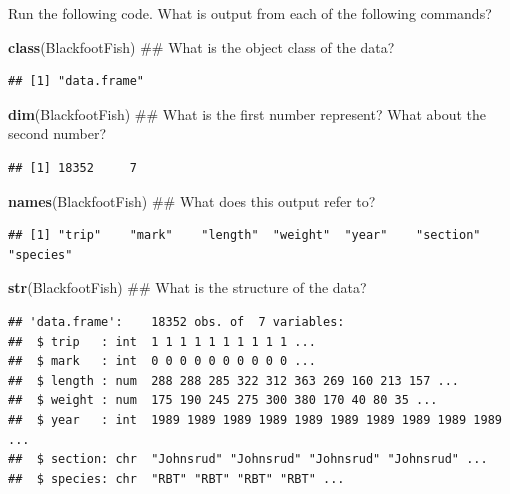 \documentclass[]{article}
\newenvironment{Shaded}{\begin{snugshade}}{\end{snugshade}}
\newcommand{\KeywordTok}[1]{\textcolor[rgb]{0.13,0.29,0.53}{\textbf{#1}}}
\newcommand{\NormalTok}[1]{#1}
\begin{document}
Run the following code. What is output from each of the following
commands?

\vspace{0.25cm}

\begin{Shaded}
\begin{Highlighting}[]
\KeywordTok{class}\NormalTok{(BlackfootFish)  ## What is the object class of the data?}
\end{Highlighting}
\end{Shaded}

\begin{verbatim}
## [1] "data.frame"
\end{verbatim}

\begin{Shaded}
\begin{Highlighting}[]
\KeywordTok{dim}\NormalTok{(BlackfootFish)  ## What is the first number represent? What about the second number?}
\end{Highlighting}
\end{Shaded}

\begin{verbatim}
## [1] 18352     7
\end{verbatim}

\begin{Shaded}
\begin{Highlighting}[]
\KeywordTok{names}\NormalTok{(BlackfootFish)  ## What does this output refer to?}
\end{Highlighting}
\end{Shaded}

\begin{verbatim}
## [1] "trip"    "mark"    "length"  "weight"  "year"    "section" "species"
\end{verbatim}

\begin{Shaded}
\begin{Highlighting}[]
\KeywordTok{str}\NormalTok{(BlackfootFish)  ## What is the structure of the data?}
\end{Highlighting}
\end{Shaded}

\begin{verbatim}
## 'data.frame':    18352 obs. of  7 variables:
##  $ trip   : int  1 1 1 1 1 1 1 1 1 1 ...
##  $ mark   : int  0 0 0 0 0 0 0 0 0 0 ...
##  $ length : num  288 288 285 322 312 363 269 160 213 157 ...
##  $ weight : num  175 190 245 275 300 380 170 40 80 35 ...
##  $ year   : int  1989 1989 1989 1989 1989 1989 1989 1989 1989 1989 ...
##  $ section: chr  "Johnsrud" "Johnsrud" "Johnsrud" "Johnsrud" ...
##  $ species: chr  "RBT" "RBT" "RBT" "RBT" ...
\end{verbatim}
\end{document}
